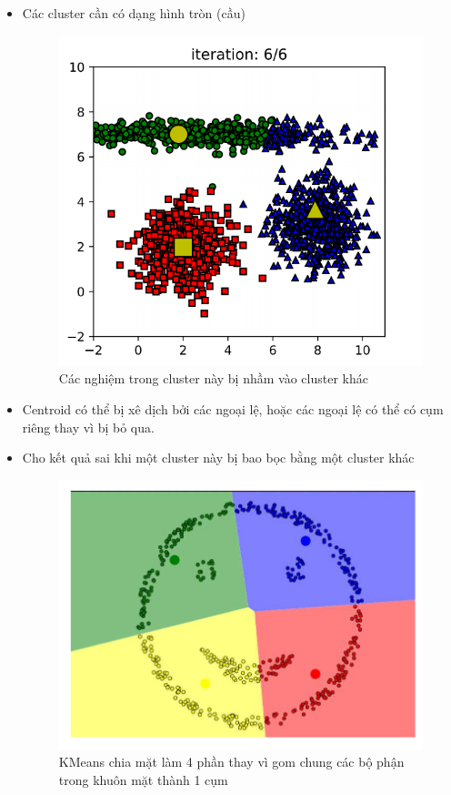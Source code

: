 \begin{itemize}
\begin{figure}[h]
	\end{figure}
	\item Các cluster cần có dạng hình tròn (cầu)	
	\begin{figure}[h]
		\centering
		\includegraphics[width=0.3\linewidth]{img/disad_3}
		\caption{Các nghiệm trong cluster này bị nhầm vào cluster khác}
	\end{figure}
	\item Centroid có thể bị xê dịch bởi các ngoại lệ, hoặc các ngoại lệ có thể có cụm riêng thay vì bị bỏ qua.
	\item Cho kết quả sai khi một cluster này bị bao bọc bằng một cluster khác
	\begin{figure}[h]
		\centering
		\includegraphics[width=0.5\linewidth]{img/disad_4}
		\caption{KMeans chia mặt làm 4 phần thay vì gom chung các bộ phận trong khuôn mặt thành 1 cụm}
	\end{figure}	
\end{itemize}
